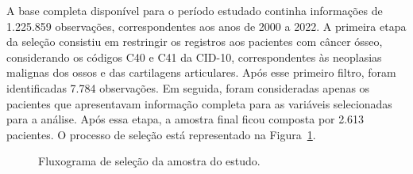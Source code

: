 \documentclass[11pt,a4paper]{article}
\begin{document}
A base completa disponível para o período estudado continha informações de 1.225.859 observações, correspondentes aos anos de 2000 a 2022. A primeira etapa da seleção consistiu em restringir os registros aos pacientes com câncer ósseo, considerando os códigos C40 e C41 da CID-10, correspondentes às neoplasias malignas dos ossos e das cartilagens articulares. Após esse primeiro filtro, foram identificadas 7.784 observações. Em seguida, foram consideradas apenas os pacientes que apresentavam informação completa para as variáveis selecionadas para a análise. Após essa etapa, a amostra final ficou composta por 2.613 pacientes. O processo de seleção está representado na Figura~\ref{fig:fluxograma}.

\begin{figure}[H]
\centering


\caption{Fluxograma de seleção da amostra do estudo.}
\label{fig:fluxograma}

\end{figure}
\end{document}
